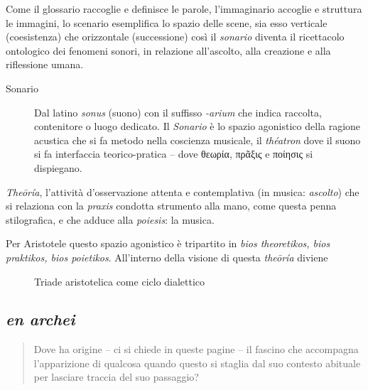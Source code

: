 \documentclass{gs}
\begin{document}
Come il glossario raccoglie e definisce le parole, l'immaginario accoglie e struttura le immagini, lo scenario esemplifica lo spazio delle scene, sia esso verticale (coesistenza) che orizzontale (successione) così il \emph{sonario} diventa il ricettacolo ontologico dei fenomeni sonori, in relazione all'ascolto, alla creazione e alla riflessione umana.

\begin{description}

  \item[Sonario] Dal latino \emph{sonus} (suono) con il suffisso \emph{-arium} che indica raccolta, contenitore o luogo dedicato. Il \emph{Sonario} è lo spazio agonistico della ragione acustica che si fa metodo nella coscienza musicale, il \emph{théatron} dove il suono si fa interfaccia teorico-pratica – dove \textgreek{θεωρία}, \textgreek{πρᾶξις} e \textgreek{ποίησις} si dispiegano.

\end{description}

\emph{Theōría}, l'attività d'osservazione attenta e contemplativa (in musica: \emph{ascolto}) che si relaziona con la \emph{praxis} condotta strumento alla mano, come questa penna stilografica, e che adduce alla \emph{poiesis}: la musica.

Per Aristotele questo spazio agonistico è tripartito in \emph{bios theoretikos, bios praktikos, bios poietikos}. All'interno della visione di questa \emph{theōría} diviene

\begin{figure}[htbp]
\begin{center}
\caption{Triade aristotelica come ciclo dialettico}
\label{poiesis}
\end{center}
\end{figure}

\subsection*{\emph{en archei}}

\begin{quote}
\begin{sf}
\small
Dove ha origine – ci si chiede in queste pagine – il fascino che accompagna l'apparizione di qualcosa quando questo si staglia dal suo contesto abituale per lasciare traccia del suo passaggio?
\end{sf}
\end{quote}
\end{document}
